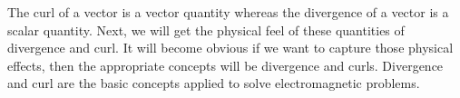 The curl of a vector is a vector quantity whereas the divergence of a vector is a scalar quantity. Next, we will get the physical feel of these quantities of divergence and curl. It will become obvious if we want to capture those physical effects, then the appropriate concepts will be divergence and curls. Divergence and curl are the basic concepts applied to solve electromagnetic problems. 